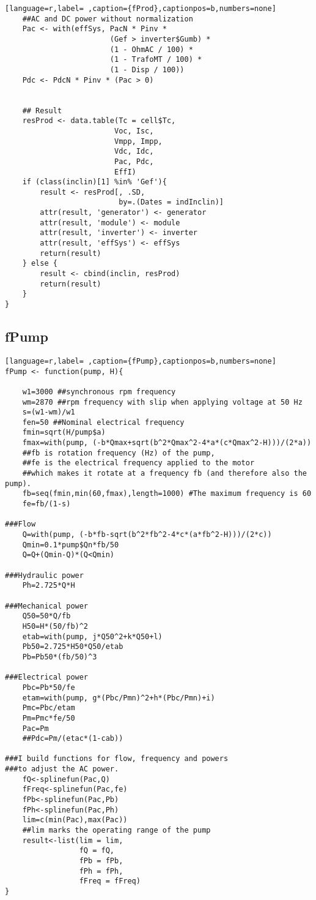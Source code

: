 \begin{lstlisting}[language=r,label= ,caption={fProd},captionpos=b,numbers=none]
    ##AC and DC power without normalization
    Pac <- with(effSys, PacN * Pinv *
                        (Gef > inverter$Gumb) *
                        (1 - OhmAC / 100) *
                        (1 - TrafoMT / 100) *
                        (1 - Disp / 100))
    Pdc <- PdcN * Pinv * (Pac > 0)


    ## Result
    resProd <- data.table(Tc = cell$Tc,
                         Voc, Isc,
                         Vmpp, Impp,
                         Vdc, Idc,
                         Pac, Pdc,
                         EffI)
    if (class(inclin)[1] %in% 'Gef'){
        result <- resProd[, .SD,
                          by=.(Dates = indInclin)]
        attr(result, 'generator') <- generator
        attr(result, 'module') <- module
        attr(result, 'inverter') <- inverter
        attr(result, 'effSys') <- effSys
        return(result)
    } else {
        result <- cbind(inclin, resProd)
        return(result)
    }
}
\end{lstlisting}
\subsection{fPump}
\label{sec:org6ca8765}
\label{subsec:fpump}
\begin{lstlisting}[language=r,label= ,caption={fPump},captionpos=b,numbers=none]
fPump <- function(pump, H){

    w1=3000 ##synchronous rpm frequency
    wm=2870 ##rpm frequency with slip when applying voltage at 50 Hz
    s=(w1-wm)/w1
    fen=50 ##Nominal electrical frequency
    fmin=sqrt(H/pump$a)
    fmax=with(pump, (-b*Qmax+sqrt(b^2*Qmax^2-4*a*(c*Qmax^2-H)))/(2*a))
    ##fb is rotation frequency (Hz) of the pump,  
    ##fe is the electrical frequency applied to the motor
    ##which makes it rotate at a frequency fb (and therefore also the pump).
    fb=seq(fmin,min(60,fmax),length=1000) #The maximum frequency is 60
    fe=fb/(1-s)

###Flow
    Q=with(pump, (-b*fb-sqrt(b^2*fb^2-4*c*(a*fb^2-H)))/(2*c))
    Qmin=0.1*pump$Qn*fb/50
    Q=Q+(Qmin-Q)*(Q<Qmin)

###Hydraulic power
    Ph=2.725*Q*H

###Mechanical power
    Q50=50*Q/fb
    H50=H*(50/fb)^2
    etab=with(pump, j*Q50^2+k*Q50+l)
    Pb50=2.725*H50*Q50/etab
    Pb=Pb50*(fb/50)^3

###Electrical power
    Pbc=Pb*50/fe
    etam=with(pump, g*(Pbc/Pmn)^2+h*(Pbc/Pmn)+i)
    Pmc=Pbc/etam
    Pm=Pmc*fe/50
    Pac=Pm
    ##Pdc=Pm/(etac*(1-cab))

###I build functions for flow, frequency and powers
###to adjust the AC power.
    fQ<-splinefun(Pac,Q)
    fFreq<-splinefun(Pac,fe)
    fPb<-splinefun(Pac,Pb)
    fPh<-splinefun(Pac,Ph)
    lim=c(min(Pac),max(Pac))
    ##lim marks the operating range of the pump
    result<-list(lim = lim,
                 fQ = fQ,
                 fPb = fPb,
                 fPh = fPh,
                 fFreq = fFreq)
}
\end{lstlisting}
